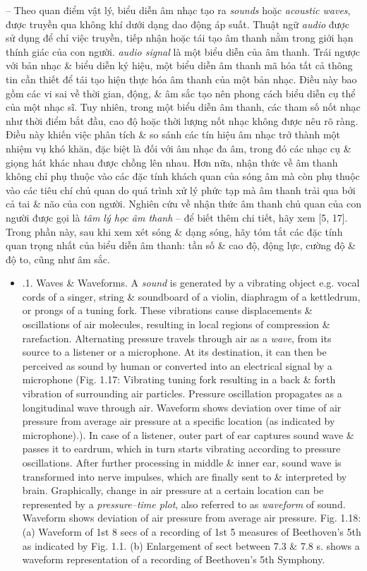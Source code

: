 \documentclass{article}
\begin{document}
\begin{itemize}
\begin{itemize}
		-- Theo quan điểm vật lý, biểu diễn âm nhạc tạo ra {\it sounds} hoặc {\it acoustic waves}, được truyền qua không khí dưới dạng dao động áp suất. Thuật ngữ {\it audio} được sử dụng để chỉ việc truyền, tiếp nhận hoặc tái tạo âm thanh nằm trong giới hạn thính giác của con người. {\it audio signal} là một biểu diễn của âm thanh. Trái ngược với bản nhạc \& biểu diễn ký hiệu, một biểu diễn âm thanh mã hóa tất cả thông tin cần thiết để tái tạo hiện thực hóa âm thanh của một bản nhạc. Điều này bao gồm các vi sai về thời gian, động, \& âm sắc tạo nên phong cách biểu diễn cụ thể của một nhạc sĩ. Tuy nhiên, trong một biểu diễn âm thanh, các tham số nốt nhạc như thời điểm bắt đầu, cao độ hoặc thời lượng nốt nhạc không được nêu rõ ràng. Điều này khiến việc phân tích \& so sánh các tín hiệu âm nhạc trở thành một nhiệm vụ khó khăn, đặc biệt là đối với âm nhạc đa âm, trong đó các nhạc cụ \& giọng hát khác nhau được chồng lên nhau. Hơn nữa, nhận thức về âm thanh không chỉ phụ thuộc vào các đặc tính khách quan của sóng âm mà còn phụ thuộc vào các tiêu chí chủ quan do quá trình xử lý phức tạp mà âm thanh trải qua bởi cả tai \& não của con người. Nghiên cứu về nhận thức âm thanh chủ quan của con người được gọi là {\it tâm lý học âm thanh} -- để biết thêm chi tiết, hãy xem [5, 17]. Trong phần này, sau khi xem xét sóng \& dạng sóng, hãy tóm tắt các đặc tính quan trọng nhất của biểu diễn âm thanh: tần số \& cao độ, động lực, cường độ \& độ to, cũng như âm sắc.
		\begin{itemize}
			\item {.1. Waves \& Waveforms.} A {\it sound} is generated by a vibrating object e.g. vocal cords of a singer, string \& soundboard of a violin, diaphragm of a kettledrum, or prongs of a tuning fork. These vibrations cause displacements \& oscillations of air molecules, resulting in local regions of compression \& rarefaction. Alternating pressure travels through air as a {\it wave}, from its source to a listener or a microphone. At its destination, it can then be perceived as sound by human or converted into an electrical signal by a microphone ({\sf Fig. 1.17: Vibrating tuning fork resulting in a back \& forth vibration of surrounding air particles. Pressure oscillation propagates as a longitudinal wave through air. Waveform shows deviation over time of air pressure from average air pressure at a specific location (as indicated by microphone).}). In case of a listener, outer part of ear captures sound wave \& passes it to eardrum, which in turn starts vibrating according to pressure oscillations. After further processing in middle \& inner ear, sound wave is transformed into nerve impulses, which are finally sent to \& interpreted by brain. Graphically, change in air pressure at a certain location can be represented by a {\it pressure--time plot}, also referred to as {\it waveform} of sound. Waveform shows deviation of air pressure from average air pressure. {\sf Fig. 1.18: (a) Waveform of 1st 8 secs of a recording of 1st 5 measures of Beethoven's 5th as indicated by Fig. 1.1. (b) Enlargement of sect between 7.3 \& 7.8 s.} shows a waveform representation of a recording of Beethoven's 5th Symphony.
			

\end{itemize}
\end{itemize}
\end{itemize}
\end{document}
